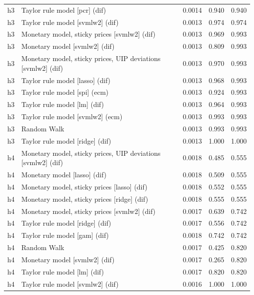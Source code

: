 \begin{ThreePartTable}
\begin{longtable}[t]{cp{5.5cm}ccc}
\addlinespace
h3 & \raggedright Taylor rule model [pcr] (dif) & 0.0014 & 0.940 & 0.940\\
h3 & \raggedright Taylor rule model [svmlw2] (dif) & 0.0013 & 0.974 & 0.974\\
h3 & \raggedright Monetary model, sticky prices [svmlw2] (dif) & 0.0013 & 0.969 & 0.993\\
h3 & \raggedright Monetary model [svmlw2] (dif) & 0.0013 & 0.809 & 0.993\\
h3 & \raggedright Monetary model, sticky prices, UIP deviations [svmlw2] (dif) & 0.0013 & 0.970 & 0.993\\
h3 & \raggedright Taylor rule model [lasso] (dif) & 0.0013 & 0.968 & 0.993\\
h3 & \raggedright Taylor rule model [spi] (ecm) & 0.0013 & 0.924 & 0.993\\
h3 & \raggedright Taylor rule model [lm] (dif) & 0.0013 & 0.964 & 0.993\\
h3 & \raggedright Taylor rule model [svmlw2] (ecm) & 0.0013 & 0.993 & 0.993\\
h3 & \raggedright Random Walk & 0.0013 & 0.993 & 0.993\\
h3 & \raggedright Taylor rule model [ridge] (dif) & 0.0013 & 1.000 & 1.000\\
\addlinespace
h4 & \raggedright Monetary model, sticky prices, UIP deviations [svmlw2] (dif) & 0.0018 & 0.485 & 0.555\\
h4 & \raggedright Monetary model [lasso] (dif) & 0.0018 & 0.509 & 0.555\\
h4 & \raggedright Monetary model, sticky prices [lasso] (dif) & 0.0018 & 0.552 & 0.555\\
h4 & \raggedright Monetary model, sticky prices [ridge] (dif) & 0.0018 & 0.555 & 0.555\\
h4 & \raggedright Monetary model, sticky prices [svmlw2] (dif) & 0.0017 & 0.639 & 0.742\\
h4 & \raggedright Taylor rule model [ridge] (dif) & 0.0017 & 0.556 & 0.742\\
h4 & \raggedright Taylor rule model [gam] (dif) & 0.0018 & 0.742 & 0.742\\
h4 & \raggedright Random Walk & 0.0017 & 0.425 & 0.820\\
h4 & \raggedright Monetary model [svmlw2] (dif) & 0.0017 & 0.265 & 0.820\\
h4 & \raggedright Taylor rule model [lm] (dif) & 0.0017 & 0.820 & 0.820\\
h4 & \raggedright Taylor rule model [svmlw2] (dif) & 0.0016 & 1.000 & 1.000\\

\end{longtable}
\end{ThreePartTable}
